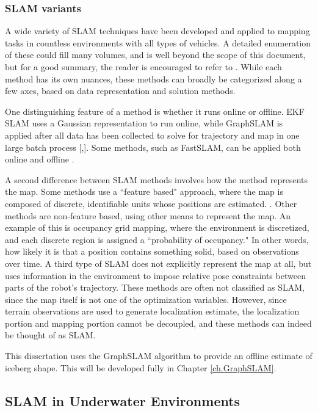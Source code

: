 \subsubsection{SLAM variants}

A wide variety of SLAM techniques have been developed and applied to mapping tasks in countless environments with all types of vehicles. A detailed enumeration of these could fill many volumes, and is well beyond the scope of this document, but for a good summary, the reader is encouraged to refer to \cite{SLAMoverview}. While each method has its own nuances, these methods can broadly be categorized along a few axes, based on data representation and solution methods. 

One distinguishing feature of a method is whether it runs online or offline. EKF SLAM uses a Gaussian representation to run online, while GraphSLAM is applied after all data has been collected to solve for trajectory and map in one large batch process [\cite{},\cite{}]. Some methods, such as FastSLAM, can be applied both online and offline \cite{FastSLAM}.

A second difference between SLAM methods involves how the method represents the map. Some methods use a ``feature based" approach, where the map is composed of discrete, identifiable units whose positions are estimated. \cite{?}. Other methods are non-feature based, using other means to represent the map. An example of this is occupancy grid mapping, where the environment is discretized, and each discrete region is assigned a ``probability of occupancy." In other words, how likely it is that a position contains something solid, based on observations over time.  A third type of SLAM does not explicitly represent the map at all, but uses information in the environment to impose relative pose constraints between parts of the robot's trajectory. These methods are often not classified as SLAM, since the map itself is not one of the optimization variables. However, since terrain observations are used to generate localization estimate,  the localization portion and mapping portion cannot be decoupled, and these methods can indeed be thought of as SLAM. 

This dissertation uses the GraphSLAM algorithm \cite{Thrun2006} to provide an offline estimate of iceberg shape. This will be developed fully in Chapter \ref{ch.GraphSLAM}. 

\subsection{SLAM in Underwater Environments}

